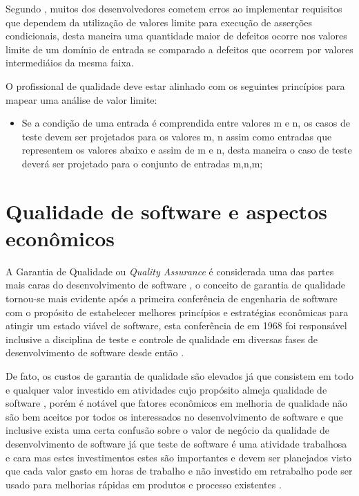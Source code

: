 \documentclass[
	12pt,				%
	oneside,			%
	a4paper,			%
	english,			%
	brazil				%
	]{abntex2ppgsi}
\begin{document}
Segundo \cite{Jacob2016}, muitos dos desenvolvedores cometem erros ao implementar requisitos que dependem da utilização de valores limite para execução de asserções condicionais, desta maneira uma quantidade maior de defeitos ocorre nos valores limite de um domínio de entrada se comparado a defeitos que ocorrem por valores intermediáios da mesma faixa.

O profissional de qualidade deve estar alinhado com os seguintes princípios para mapear uma análise de valor limite:

\begin{itemize}
	\item Se a condição de uma entrada  é comprendida entre valores m e n, os casos de teste devem ser projetados para os valores m, n assim como entradas que representem os valores abaixo e assim de m e n, desta maneira o caso de teste deverá ser projetado para o conjunto de entradas {m,n,m};
\end{itemize}

\section{Qualidade de software e aspectos econômicos}

A Garantia de Qualidade ou \textit{Quality Assurance} é considerada uma das partes mais caras do desenvolvimento de software \cite{wagner2005}, o conceito de garantia de qualidade tornou-se mais evidente após a primeira conferência de engenharia de software com o propósito de estabelecer melhores princípios e estratégias econômicas para atingir um estado viável de software, esta conferência de em 1968 foi responsável	 inclusive a disciplina de teste e controle de qualidade em diversas  fases de desenvolvimento de software desde então \cite{repasi2009}.

De fato, os custos de garantia de qualidade são elevados \cite{wagner2005} \cite{Korel1990} já que consistem em todo e qualquer valor investido em atividades cujo propósito almeja qualidade de software \cite{pressman2009engenharia}, porém é notável que fatores econômicos em melhoria de qualidade não são bem aceitos por todos os interessados no desenvolvimento de software e que inclusive exista uma certa confusão sobre o valor de negócio da qualidade de desenvolvimento de software \cite{slaughter1998} já que teste de software é uma atividade trabalhosa e cara \cite{Korel1990} mas estes investimentos estes são importantes e devem ser planejados visto que cada valor gasto em horas de trabalho e não investido em retrabalho pode ser usado para melhorias rápidas em produtos e processo existentes \cite{slaughter1998}.
\end{document}
